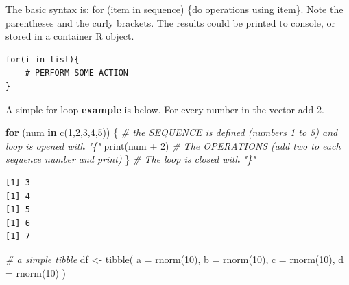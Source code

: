 \documentclass[
]{book}
\newenvironment{Shaded}{\begin{snugshade}}{\end{snugshade}}
\newcommand{\AttributeTok}[1]{\textcolor[rgb]{0.77,0.63,0.00}{#1}}
\newcommand{\CommentTok}[1]{\textcolor[rgb]{0.56,0.35,0.01}{\textit{#1}}}
\newcommand{\ControlFlowTok}[1]{\textcolor[rgb]{0.13,0.29,0.53}{\textbf{#1}}}
\newcommand{\DecValTok}[1]{\textcolor[rgb]{0.00,0.00,0.81}{#1}}
\newcommand{\FunctionTok}[1]{\textcolor[rgb]{0.00,0.00,0.00}{#1}}
\newcommand{\NormalTok}[1]{#1}
\newcommand{\OtherTok}[1]{\textcolor[rgb]{0.56,0.35,0.01}{#1}}
\newcommand{\SpecialCharTok}[1]{\textcolor[rgb]{0.00,0.00,0.00}{#1}}
\begin{document}
The basic syntax is: for (item in sequence) \{do operations using item\}. Note the parentheses and the curly brackets. The results could be printed to console, or stored in a container R object.

\begin{verbatim}
for(i in list){
    # PERFORM SOME ACTION
}
\end{verbatim}

A simple for loop \textbf{example} is below. For every number in the vector add 2.

\begin{Shaded}
\begin{Highlighting}[]
\ControlFlowTok{for}\NormalTok{ (num }\ControlFlowTok{in} \FunctionTok{c}\NormalTok{(}\DecValTok{1}\NormalTok{,}\DecValTok{2}\NormalTok{,}\DecValTok{3}\NormalTok{,}\DecValTok{4}\NormalTok{,}\DecValTok{5}\NormalTok{)) \{  }\CommentTok{\# the SEQUENCE is defined (numbers 1 to 5) and loop is opened with "\{"}
  \FunctionTok{print}\NormalTok{(num }\SpecialCharTok{+} \DecValTok{2}\NormalTok{)             }\CommentTok{\# The OPERATIONS (add two to each sequence number and print)}
\NormalTok{\}                            }\CommentTok{\# The loop is closed with "\}"                            }
\end{Highlighting}
\end{Shaded}

\begin{verbatim}
[1] 3
[1] 4
[1] 5
[1] 6
[1] 7
\end{verbatim}

\begin{Shaded}
\begin{Highlighting}[]
\CommentTok{\# a simple tibble}
\NormalTok{df }\OtherTok{\textless{}{-}} \FunctionTok{tibble}\NormalTok{(}
  \AttributeTok{a =} \FunctionTok{rnorm}\NormalTok{(}\DecValTok{10}\NormalTok{),}
  \AttributeTok{b =} \FunctionTok{rnorm}\NormalTok{(}\DecValTok{10}\NormalTok{),}
  \AttributeTok{c =} \FunctionTok{rnorm}\NormalTok{(}\DecValTok{10}\NormalTok{),}
  \AttributeTok{d =} \FunctionTok{rnorm}\NormalTok{(}\DecValTok{10}\NormalTok{)}
\NormalTok{)}
\end{Highlighting}
\end{Shaded}

\begin{Shaded}
\end{Shaded}
\end{document}
